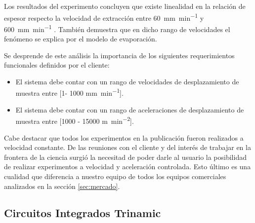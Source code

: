 Los resultados del experimento concluyen que existe linealidad  en la relación de espesor respecto la velocidad de extracción entre \SI{60}{\milli\meter\per\minute} y \SI{600}{\milli\meter\per\minute} . También demuestra que en dicho rango de velocidades el fenómeno se explica por el modelo de evaporación.

Se desprende de este análisis la importancia de los siguientes requerimientos funcionales definidos por el cliente: 

\begin{itemize}
\item El sistema debe contar con un rango de velocidades de desplazamiento de muestra entre [1- 1000 \si{\milli\meter\per\minute}]. 
\item El sistema debe contar con un rango de aceleraciones de desplazamiento de muestra entre [1000 - 15000 \si{\meter\per\square\minute}].
		
\end{itemize}
	
Cabe destacar que todos los experimentos en la publicación fueron realizados a velocidad constante. De las reuniones con el cliente y del interés de trabajar en la frontera de la ciencia surgió la necesitad de poder darle al usuario la posibilidad de realizar experimentos a velocidad y aceleración controlada. Esto último es una cualidad que diferencia a nuestro equipo de todos los equipos comerciales analizados en la sección \ref{sec:mercado}.

 


\subsection{Circuitos Integrados Trinamic}


